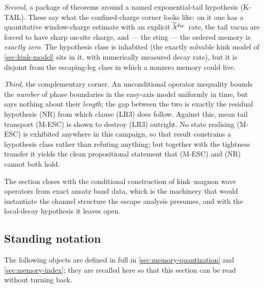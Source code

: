 \emph{Second}, a package of theorems around a named exponential-tail
hypothesis (K-TAIL). These say what the confined-charge corner looks like: on
it one has a quantitative window-charge estimate with an explicit
$\widetilde{\lambda}^{d_W}$ rate, the tail vacua are forced to have sharp on-site charge,
and --- the sting --- the ordered memory is \emph{exactly zero}. The
hypothesis class is inhabited (the exactly solvable kink model of
\cref{sec:kink-model} sits in it, with numerically measured decay rate), but
it is disjoint from the escaping-leg class in which a nonzero memory could
live.

\emph{Third}, the complementary corner. An unconditional operator inequality
bounds the \emph{number} of phase boundaries in the easy-axis model uniformly
in time, but says nothing about their \emph{length}; the gap between the two
is exactly the residual hypothesis (NR) from which clause (LR3) does follow.
Against this, mean tail transport (M-ESC) is shown to destroy (LR3) outright.
No state realising (M-ESC) is exhibited anywhere in this campaign, so that
result constrains a hypothesis class rather than refuting anything; but
together with the tightness transfer it yields the clean propositional
statement that (M-ESC) and (NR) cannot both hold.

The section closes with the conditional construction of kink--magnon wave
operators from exact ansatz band data, which is the machinery that would
instantiate the channel structure the escape analysis presumes, and with the
local-decay hypothesis it leaves open.

\subsection{Standing notation}
\label{subsec:lr-notation}

The following objects are defined in full in \cref{sec:memory-quantization}
and \cref{sec:memory-index}; they are recalled here so that this section can
be read without turning back.

